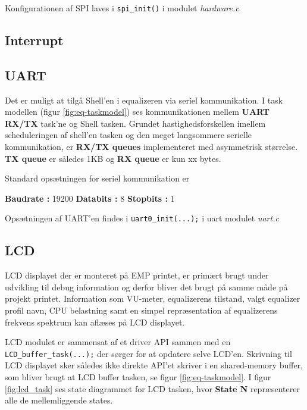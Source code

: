 
Konfigurationen af SPI laves i \texttt{spi\_init()} i modulet \textit{hardware.c}


\FloatBlock

\subsection{Interrupt}


\subsection{UART}\label{subsec:uart}
Det er muligt at tilgå Shell'en i equalizeren via seriel kommunikation.
I task modellen (figur \ref{fig:eq-taskmodel}) ses kommunikationen mellem \textbf{UART RX/TX} task'ne og Shell tasken.
Grundet hastighedsforskellen imellem scheduleringen af shell'en tasken og den meget langsommere serielle kommunikation, er \textbf{RX/TX queues} implementeret med asymmetrisk størrelse. 
\textbf{TX queue} er således 1KB og \textbf{RX queue} er kun  xx bytes.

Standard opsætningen for seriel kommunikation er
\begin{center}
	\textbf{Baudrate : }19200  \quad \textbf{Databits : } 8 \quad \textbf{Stopbits : }1
\end{center}

Opsætningen af UART'en findes i \texttt{uart0\_init(...);} i uart modulet \textit{uart.c}

\subsection{LCD}
LCD displayet der er monteret på EMP printet, er primært brugt under udvikling til debug information og derfor bliver det brugt på samme måde på projekt printet.
Information som VU-meter, equalizerens tilstand, valgt equalizer profil navn, CPU belastning samt en simpel repræsentation af equalizerens frekvens spektrum kan aflæses på LCD displayet.

LCD modulet er sammensat af et driver API sammen med en \texttt{LCD\_buffer\_task(...);} der sørger for at opdatere selve LCD'en.
Skrivning til LCD displayet sker således ikke direkte
API'et skriver i en shared-memory buffer, som bliver brugt at LCD buffer tasken, se figur \ref{fig:eq-taskmodel}. 
I figur \ref{fig:lcd_task} ses state diagrammet for LCD tasken, hvor \textbf{State N} repræsenterer alle de mellemliggende states.

